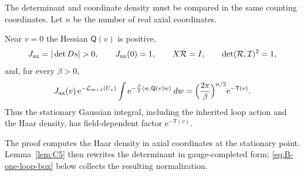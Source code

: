The determinant and coordinate density must be compared in the same counting coordinates. Let $n$ be the number of real axial coordinates.
\begin{lemma}\label{lem:B4}
Near $v=0$ the Hessian $\mathsf Q(v)$ is positive,
\begin{equation*}
J_{\rm ax}=|\det Ds|>0,\qquad J_{\rm ax}(0)=1,\qquad
X\mathcal R=I,\qquad \det(\mathcal R,\mathcal I)^2=1,
\end{equation*}
and, for every $\beta>0$,
\begin{equation*}
J_{\rm ax}(v)\,\mathrm e^{-\mathcal L_{m+1}(U_v)}\int\mathrm e^{-\frac\beta2\langle w,\mathsf Q(v)w\rangle}\,dw
=\Bigl(\frac{2\pi}\beta\Bigr)^{n/2}\mathrm e^{-\mathsf T(v)}.
\end{equation*}
Thus the stationary Gaussian integral, including the inherited loop action and the Haar density, has field-dependent factor $\mathrm e^{-\mathsf T(v)}$.
\end{lemma}
The proof computes the Haar density in axial coordinates at the stationary point. Lemma~\ref{lem:C5} then rewrites the determinant in gauge-completed form; \eqref{eq:B-one-loop-box} below collects the resulting normalization.
